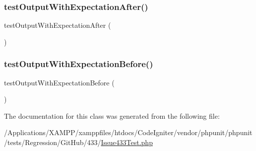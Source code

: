 \mbox{\label{class_issue433_test_acaa232f0410700a492c839aae855a504}} 
\subsubsection{\texorpdfstring{test\+Output\+With\+Expectation\+After()}{testOutputWithExpectationAfter()}}
{\footnotesize\ttfamily test\+Output\+With\+Expectation\+After (\begin{DoxyParamCaption}{ }\end{DoxyParamCaption})}

\mbox{\label{class_issue433_test_adf7c386bf9eafdf68da61e980d940938}} 
\subsubsection{\texorpdfstring{test\+Output\+With\+Expectation\+Before()}{testOutputWithExpectationBefore()}}
{\footnotesize\ttfamily test\+Output\+With\+Expectation\+Before (\begin{DoxyParamCaption}{ }\end{DoxyParamCaption})}



The documentation for this class was generated from the following file\+:\begin{DoxyCompactItemize}
\item 
/\+Applications/\+X\+A\+M\+P\+P/xamppfiles/htdocs/\+Code\+Igniter/vendor/phpunit/phpunit/tests/\+Regression/\+Git\+Hub/433/\mbox{\hyperlink{_issue433_test_8php}{Issue433\+Test.\+php}}\end{DoxyCompactItemize}
